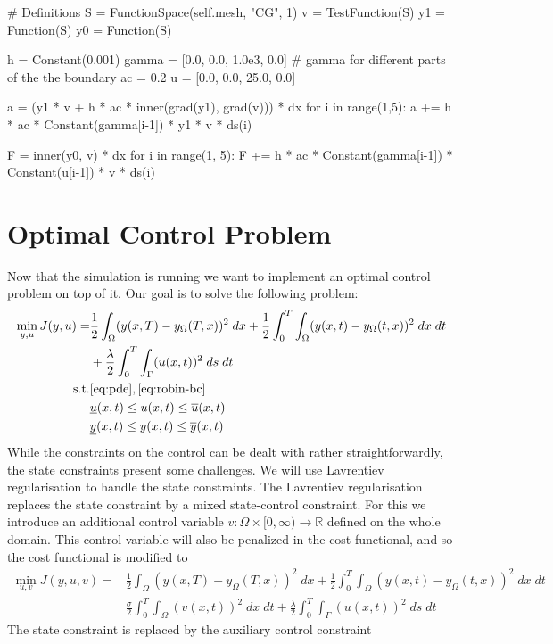 \documentclass[
12pt, %
a4paper, %
onecolumn, %
portrait %
]{article}
\begin{document}
\begin{python}
# Definitions 
S = FunctionSpace(self.mesh, "CG", 1)
v = TestFunction(S)
y1 = Function(S)
y0 = Function(S)

h = Constant(0.001)
gamma = [0.0, 0.0, 1.0e3, 0.0] # gamma for different parts of the the boundary
ac = 0.2
u = [0.0, 0.0, 25.0, 0.0]
\end{python}

\begin{python}
a = (y1 * v + h * ac * inner(grad(y1), grad(v))) * dx
for i in range(1,5):
    a += h * ac * Constant(gamma[i-1]) * y1 * v * ds(i)
\end{python}


\begin{python}
F = inner(y0, v) * dx
for i in range(1, 5):
    F += h * ac * Constant(gamma[i-1]) * Constant(u[i-1]) * v * ds(i)
\end{python}

\section{Optimal Control Problem}
Now that the simulation is running we want to implement an optimal control problem on top of it. Our goal is to solve the following problem:
\begin{align*}
\min_{y,u} J(y, u) = & \frac{1}{2}\int_{\Omega} (y(x, T) - y_{\Omega}(T,x))^2 \; dx + \frac{1}{2} \int_{0}^{T} \int_{\Omega} (y(x,t) - y_{\Omega}(t,x))^2 \; dx \; dt \\
& + \frac{\lambda}{2} \int_{0}^{T} \int_{\Gamma} (u(x,t))^2 \; ds \; dt \\
\text{s.t.} & \eqref{eq:pde}, \eqref{eq:robin-bc} \\
& \underline{u}(x,t) \leq u(x,t) \leq \overline{u}(x,t) \\
& \underline{y}(x,t) \leq y(x,t) \leq \overline{y}(x,t)
\end{align*}
While the constraints on the control can be dealt with rather straightforwardly, the state constraints present some challenges. We will use Lavrentiev regularisation to handle the state constraints. The Lavrentiev regularisation replaces the state constraint by a mixed state-control constraint. For this we introduce an additional control variable $v : \Omega \times [0, \infty) \rightarrow \mathbb{R}$ defined on the whole domain. This control variable will also be penalized in the cost functional, and so the cost functional is modified to
\begin{align*}
\min_{u,v} J(y, u, v) = & \frac{1}{2}\int_{\Omega} (y(x, T) - y_{\Omega}(T,x))^2 \; dx + \frac{1}{2} \int_{0}^{T} \int_{\Omega} (y(x,t) - y_{\Omega}(t,x))^2 \; dx \; dt \\
& \frac{\sigma}{2} \int_{0}^{T} \int_{\Omega} (v(x,t))^2 \; dx \; dt 
+ \frac{\lambda}{2} \int_{0}^{T} \int_{\Gamma} (u(x,t))^2 \; ds \; dt
\end{align*}
The state constraint is replaced by the auxiliary control constraint
\end{document}
